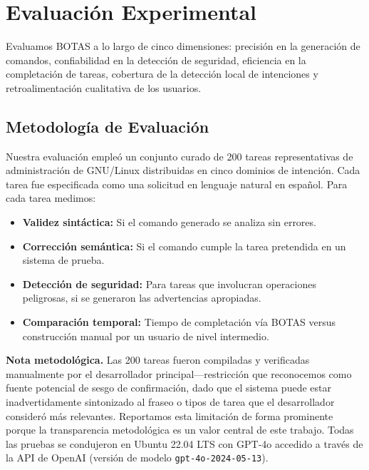 \documentclass[10pt,a4paper]{article}
\begin{document}
\section{Evaluaci\'{o}n Experimental}
\label{sec:evaluation}

Evaluamos BOTAS a lo largo de cinco dimensiones: precisi\'{o}n en la generaci\'{o}n de comandos, confiabilidad en la detecci\'{o}n de seguridad, eficiencia en la completaci\'{o}n de tareas, cobertura de la detecci\'{o}n local de intenciones y retroalimentaci\'{o}n cualitativa de los usuarios.

\subsection{Metodolog\'{i}a de Evaluaci\'{o}n}
\label{subsec:eval-methodology}

Nuestra evaluaci\'{o}n emple\'{o} un conjunto curado de 200 tareas representativas de administraci\'{o}n de GNU/Linux distribuidas en cinco dominios de intenci\'{o}n. Cada tarea fue especificada como una solicitud en lenguaje natural en espa\~{n}ol. Para cada tarea medimos:

\begin{itemize}[noitemsep,topsep=0pt]
    \item \textbf{Validez sint\'{a}ctica:} Si el comando generado se analiza sin errores.
    \item \textbf{Correcci\'{o}n sem\'{a}ntica:} Si el comando cumple la tarea pretendida en un sistema de prueba.
    \item \textbf{Detecci\'{o}n de seguridad:} Para tareas que involucran operaciones peligrosas, si se generaron las advertencias apropiadas.
    \item \textbf{Comparaci\'{o}n temporal:} Tiempo de completaci\'{o}n v\'{i}a BOTAS versus construcci\'{o}n manual por un usuario de nivel intermedio.
\end{itemize}

\textbf{Nota metodol\'{o}gica.} Las 200 tareas fueron compiladas y verificadas manualmente por el desarrollador principal---restricci\'{o}n que reconocemos como fuente potencial de sesgo de confirmaci\'{o}n, dado que el sistema puede estar inadvertidamente sintonizado al fraseo o tipos de tarea que el desarrollador consider\'{o} m\'{a}s relevantes. Reportamos esta limitaci\'{o}n de forma prominente porque la transparencia metodol\'{o}gica es un valor central de este trabajo. Todas las pruebas se condujeron en Ubuntu 22.04 LTS con GPT-4o accedido a trav\'{e}s de la API de OpenAI (versi\'{o}n de modelo \texttt{gpt-4o-2024-05-13}).
\end{document}
